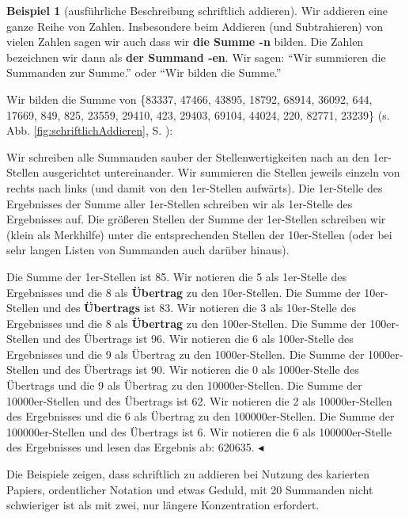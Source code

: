 \documentclass[a4paper]{book}%
\newcommand{\topicend}{
      $\blacktriangleleft$
}
\theoremstyle{definition}
\newtheorem{beispiel}{Beispiel}
\begin{document}
\begin{beispiel}[ausführliche Beschreibung schriftlich addieren]
    Wir addieren eine ganze Reihe von Zahlen. Insbesondere beim Addieren (und Subtrahieren) von vielen Zahlen sagen wir auch dass wir \textbf{die Summe -n} bilden. Die Zahlen bezeichnen wir dann als \textbf{der Summand -en}. Wir sagen: \enquote{Wir summieren die Summanden zur Summe.} oder \enquote{Wir bilden die Summe.}

    Wir bilden die Summe von \{83337, 47466, 43895, 18792, 68914, 36092, 644, 17669, 849, 825, 23559, 29410, 423, 29403, 69104, 44024, 220, 82771, 23239\} (s. Abb. \ref{fig:schriftlichAddieren}, S. \pageref{fig:schriftlichAddieren}):

    Wir schreiben alle Summanden sauber der Stellenwertigkeiten nach an den 1er-Stellen ausgerichtet untereinander. Wir summieren die Stellen jeweils einzeln von rechts nach links (und damit von den 1er-Stellen aufwärts). Die 1er-Stelle des Ergebnisses der Summe aller 1er-Stellen schreiben wir als 1er-Stelle des Ergebnisses auf. Die größeren Stellen der Summe der 1er-Stellen schreiben wir (klein als Merkhilfe) unter die entsprechenden Stellen der 10er-Stellen (oder bei sehr langen Listen von Summanden auch darüber hinaus).

    Die Summe der 1er-Stellen ist 85. Wir notieren die 5 als 1er-Stelle des Ergebnisses und die 8 als \textbf{Übertrag} zu den 10er-Stellen. Die Summe der 10er-Stellen und des \textbf{Übertrags} ist 83. Wir notieren die 3 als 10er-Stelle des Ergebnisses und die 8 als \textbf{Übertrag} zu den 100er-Stellen. Die Summe der 100er-Stellen und des Übertrags ist 96. Wir notieren die 6 als 100er-Stelle des Ergebnisses und die 9 als Übertrag zu den 1000er-Stellen. Die Summe der 1000er-Stellen und des Übertrags ist 90. Wir notieren die 0 als 1000er-Stelle des Übertrags und die 9 als Übertrag zu den 10000er-Stellen. Die Summe der 10000er-Stellen und des Übertrags ist 62. Wir notieren die 2 als 10000er-Stellen des Ergebnisses und die 6 als Übertrag zu den 100000er-Stellen. Die Summe der 100000er-Stellen und des Übertrags ist 6. Wir notieren die 6 als 100000er-Stelle des Ergebnisses und lesen das Ergebnis ab: 620635.\topicend
\end{beispiel}

Die Beispiele zeigen, dass schriftlich zu addieren bei Nutzung des karierten Papiers, ordentlicher Notation und etwas Geduld, mit 20 Summanden nicht schwieriger ist als mit zwei, nur längere Konzentration erfordert.
\end{document}
